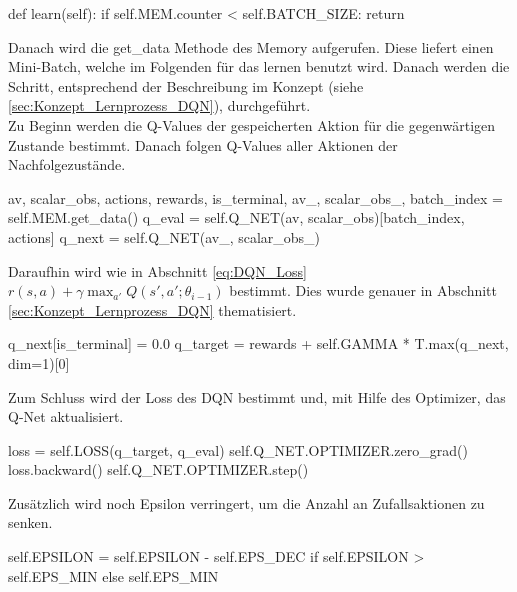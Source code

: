 \begin{python}
	def learn(self):
		if self.MEM.counter < self.BATCH_SIZE:
			return
\end{python}
Danach wird die get\_data Methode des Memory aufgerufen. Diese  liefert einen Mini-Batch, welche im Folgenden für das lernen benutzt wird. Danach werden die Schritt, entsprechend der Beschreibung im Konzept (siehe \ref{sec:Konzept_Lernprozess_DQN}), durchgeführt.\\
Zu Beginn werden die Q-Values der gespeicherten Aktion für die gegenwärtigen Zustande bestimmt. Danach folgen Q-Values aller Aktionen der Nachfolgezustände.
\begin{python}
	av, scalar_obs, actions, rewards, is_terminal, av_, scalar_obs_, batch_index = self.MEM.get_data()
	q_eval = self.Q_NET(av, scalar_obs)[batch_index, actions]
	q_next = self.Q_NET(av_, scalar_obs_)
\end{python}
Daraufhin wird wie in Abschnitt \ref{eq:DQN_Loss} $r(s,a) +\gamma \max_{a'}Q(s',a';\theta_{i-1})$ bestimmt. Dies wurde genauer in Abschnitt \ref{sec:Konzept_Lernprozess_DQN} thematisiert.
\begin{python}
	q_next[is_terminal] = 0.0
	q_target = rewards + self.GAMMA * T.max(q_next, dim=1)[0]
\end{python}
Zum Schluss wird der Loss des DQN bestimmt und, mit Hilfe des Optimizer, das Q-Net aktualisiert.
\begin{python}
	loss = self.LOSS(q_target, q_eval)
	self.Q_NET.OPTIMIZER.zero_grad()
	loss.backward()
	self.Q_NET.OPTIMIZER.step()
\end{python}
Zusätzlich wird noch Epsilon verringert, um die Anzahl an Zufallsaktionen zu senken.
\begin{python}
	self.EPSILON = self.EPSILON - self.EPS_DEC if self.EPSILON > self.EPS_MIN else self.EPS_MIN
\end{python}

